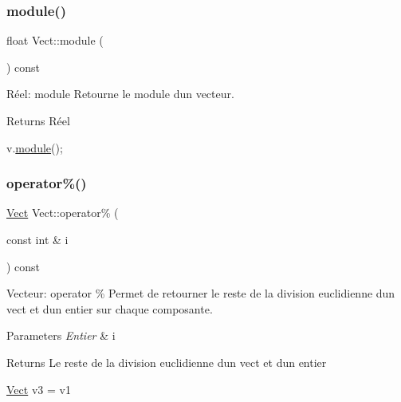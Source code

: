 \subsubsection{\texorpdfstring{module()}{module()}}
{\footnotesize\ttfamily float Vect\+::module (\begin{DoxyParamCaption}{ }\end{DoxyParamCaption}) const}



Réel\+: module Retourne le module d\textquotesingle{}un vecteur. 

\begin{DoxyReturn}{Returns}
Réel 
\begin{DoxyCode}
v.\hyperlink{classVect_aa61c71b79a4d2f2cda092648a7268c4f}{module}();
\end{DoxyCode}
 
\end{DoxyReturn}
\mbox{\label{classVect_a7c95db0096c212593a83992d8c9cc42a}} 
\subsubsection{\texorpdfstring{operator\%()}{operator\%()}}
{\footnotesize\ttfamily \hyperlink{classVect}{Vect} Vect\+::operator\% (\begin{DoxyParamCaption}\item[{const int \&}]{i }\end{DoxyParamCaption}) const}



Vecteur\+: operator \% Permet de retourner le reste de la division euclidienne d\textquotesingle{}un vect et d\textquotesingle{}un entier sur chaque composante. 


\begin{DoxyParams}{Parameters}
{\em Entier} & i \\
\hline
\end{DoxyParams}
\begin{DoxyReturn}{Returns}
Le reste de la division euclidienne d\textquotesingle{}un vect et d\textquotesingle{}un entier 
\begin{DoxyCode}
\hyperlink{classVect}{Vect} v3 = v1 %
\end{DoxyCode}
 
\end{DoxyReturn}
\mbox{\label{classVect_ab3dce1a30e0626a88cd726aa0d4f78e5}} 
